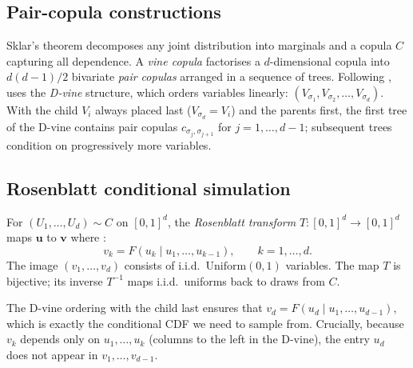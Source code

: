 \documentclass[article]{jss}
\begin{document}
\subsection{Pair-copula constructions}
\label{sec:pcc}

Sklar's theorem \citep{sklar1959fonctions} decomposes any joint distribution into
marginals and a copula $C$ capturing all dependence. A \emph{vine copula}
\citep{joe1996families, bedford2002vines, aas2009pair} factorises a
$d$-dimensional copula into $d(d-1)/2$ bivariate \emph{pair copulas} arranged in
a sequence of trees. Following \citet{dissmann2013selecting}, 
uses the \emph{D-vine} structure, which orders variables linearly:
$(V_{\sigma_1}, V_{\sigma_2}, \ldots, V_{\sigma_d})$. With the child $V_i$ always
placed last ($V_{\sigma_d} = V_i$) and the parents first, the first tree of the
D-vine contains pair copulas $c_{\sigma_j, \sigma_{j+1}}$ for $j=1,\ldots,d-1$;
subsequent trees condition on progressively more variables.

\subsection{Rosenblatt conditional simulation}
\label{sec:rosenblatt}

\begin{definition}
\label{def:rosenblatt}
For $(U_1,\ldots,U_d) \sim C$ on $[0,1]^d$, the \emph{Rosenblatt transform}
$T:[0,1]^d\to[0,1]^d$ maps $\mathbf{u}$ to $\mathbf{v}$ where
\citep{rosenblatt1952remarks}:
\[
  v_k = F(u_k \mid u_1,\ldots,u_{k-1}), \qquad k = 1,\ldots,d.
\]
The image $(v_1,\ldots,v_d)$ consists of i.i.d.\ $\mathrm{Uniform}(0,1)$
variables. The map $T$ is bijective; its inverse $T^{-1}$ maps i.i.d.\ uniforms
back to draws from $C$.
\end{definition}

\noindent
The D-vine ordering with the child last ensures that $v_d = F(u_d \mid
u_1,\ldots,u_{d-1})$, which is exactly the conditional CDF we need to sample from.
Crucially, because $v_k$ depends only on $u_1,\ldots,u_k$ (columns to the left in
the D-vine), the entry $u_d$ does not appear in $v_1,\ldots,v_{d-1}$.
\end{document}
